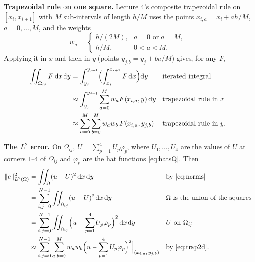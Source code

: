 \documentclass[11pt]{article}
\newcommand{\dx}{\,\mathrm{d}x}
\newcommand{\dxdy}{\,\mathrm{d}x\,\mathrm{d}y}
\newcommand{\norm}[1]{\lVert #1\rVert}
\newcommand{\Om}{\Omega}
\begin{document}
\textbf{Trapezoidal rule on one square.}  Lecture 4's composite trapezoidal
rule on $[x_{i},x_{i+1}]$ with $M$ sub-intervals of length $h/M$ uses the
points $x_{i,a}=x_{i}+ah/M$, $a=0,\dots,M$, and the weights
\begin{equation}\label{eq:wtrap}
  w_{a}=\begin{cases}h/(2M), & a=0 \text{ or } a=M,\\ h/M, & 0<a<M.\end{cases}
\end{equation}
Applying it in $x$ and then in $y$ (points $y_{j,b}=y_{j}+bh/M$) gives, for any
$F$,
\begin{align}
  \iint_{\Om_{ij}}F\dxdy
  &=\int_{y_{j}}^{y_{j+1}}\Bigl(\int_{x_{i}}^{x_{i+1}}F\dx\Bigr)\mathrm{d}y
   &&\text{iterated integral}\notag\\
  &\approx\int_{y_{j}}^{y_{j+1}}\sum_{a=0}^{M}w_{a}F(x_{i,a},y)\,\mathrm{d}y
   &&\text{trapezoidal rule in } x\notag\\
  &\approx\sum_{a=0}^{M}\sum_{b=0}^{M}w_{a}w_{b}\,F(x_{i,a},y_{j,b})
   &&\text{trapezoidal rule in } y .\label{eq:trap2d}
\end{align}

\textbf{The $L^{2}$ error.}  On $\Om_{ij}$, $U=\sum_{p=1}^{4}U_{p}\varphi_{p}$,
where $U_{1},\dots,U_{4}$ are the values of $U$ at corners $1$--$4$ of
$\Om_{ij}$ and $\varphi_{p}$ are the hat functions \eqref{eq:hatsQ}.  Then
\begin{align}
  \norm{e}_{L^{2}(\Om)}^{2}
  &=\iint_{\Om}(u-U)^{2}\dxdy
   &&\text{by \eqref{eq:norms}}\notag\\
  &=\sum_{i,j=0}^{N-1}\iint_{\Om_{ij}}(u-U)^{2}\dxdy
   &&\Om\text{ is the union of the squares}\notag\\
  &=\sum_{i,j=0}^{N-1}\iint_{\Om_{ij}}\Bigl(u-\sum_{p=1}^{4}U_{p}\varphi_{p}\Bigr)^{2}\dxdy
   &&U\text{ on }\Om_{ij}\notag\\
  &\approx\sum_{i,j=0}^{N-1}\sum_{a,b=0}^{M}w_{a}w_{b}
     \Bigl(u-\sum_{p=1}^{4}U_{p}\varphi_{p}\Bigr)^{2}\Big|_{(x_{i,a},\,y_{j,b})}
   &&\text{by \eqref{eq:trap2d}} .\label{eq:eL2sum}
\end{align}
\end{document}
